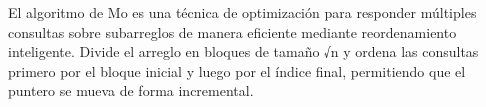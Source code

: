 \markdownRendererDocumentBegin
\markdownRendererSectionBegin
{}\markdownRendererInterblockSeparator
{}El algoritmo de Mo es una técnica de optimización para responder múltiples consultas sobre subarreglos de manera eficiente mediante reordenamiento inteligente. Divide el arreglo en bloques de tamaño √n y ordena las consultas primero por el bloque inicial y luego por el índice final, permitiendo que el puntero se mueva de forma incremental.\markdownRendererInterblockSeparator
{}
\markdownRendererSectionEnd \markdownRendererDocumentEnd